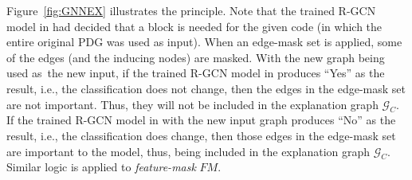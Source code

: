 
Figure~\ref{fig:GNNEX} illustrates the principle. Note that the
trained R-GCN model in {\xblock} had decided that a 
block is needed for the given code (in which the entire original PDG
was used as input). When an edge-mask set is applied, some of the
edges (and the inducing nodes) are masked. With the new graph being
used as~the new input, if the trained R-GCN model in {\xblock}
produces ``Yes'' as the result, i.e., the classification does not
change, then the edges in the edge-mask set are not
important. Thus, they will not be included in the explanation
graph $\mathcal{G}_C$. If the trained R-GCN model in {\xblock} with
the new input graph produces ``No'' as the result, i.e., the
classification does change, then those edges in the edge-mask set are
important to the model, thus, being included in the explanation graph
$\mathcal{G}_C$. Similar logic is applied to {\em feature-mask} $FM$.






